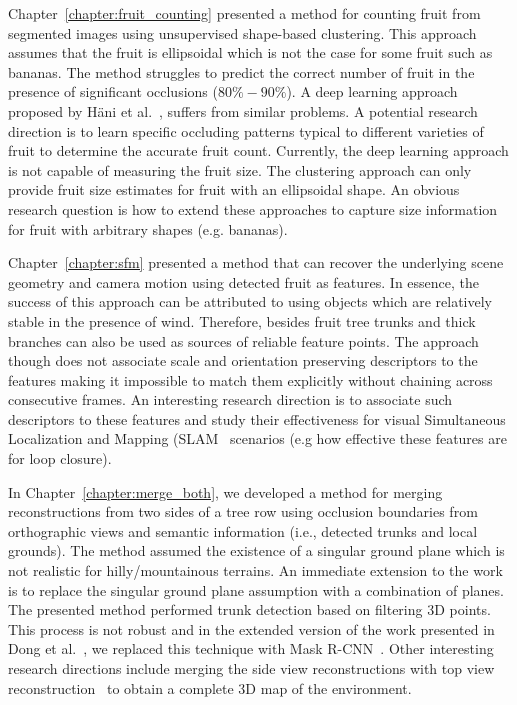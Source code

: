 Chapter~\ref{chapter:fruit_counting} presented a method for counting fruit from segmented images using unsupervised shape-based clustering. This approach assumes that the fruit is ellipsoidal which is not the case for some fruit such as bananas. The method struggles to predict the correct number of fruit in the presence of significant occlusions ($80\%- 90\%$). A deep learning approach proposed by  H{\"a}ni et al.~\cite{hani_jfr_counting}, suffers from similar problems. A potential research direction is to learn specific occluding patterns typical to different varieties of fruit to determine the accurate fruit count. Currently, the deep learning approach is not capable of measuring the fruit size. The clustering approach can only provide fruit size estimates for fruit with an ellipsoidal shape. An obvious research question is how to extend these approaches to capture size information for fruit with arbitrary shapes (e.g. bananas). 


Chapter~\ref{chapter:sfm} presented a method that can recover the underlying scene geometry and camera motion using detected fruit as features. In essence, the success of this approach can be attributed to using objects which are relatively stable in the presence of wind. Therefore, besides fruit tree trunks and thick branches can also be used as sources of reliable feature points. The approach though does not associate scale and orientation preserving descriptors to the features making it impossible to match them explicitly without chaining across consecutive frames. An interesting research direction is to associate such descriptors to these features and study their effectiveness for visual Simultaneous Localization and Mapping (SLAM~\cite{mur2017orb} scenarios (e.g how effective these features are for loop closure). 


In Chapter~\ref{chapter:merge_both}, we developed a method for merging reconstructions from two sides of a tree row using occlusion boundaries from orthographic views and semantic information (i.e., detected trunks and local grounds). The method assumed the existence of a singular ground plane which is not realistic for hilly/mountainous terrains. An immediate extension to the work is to replace the singular ground plane assumption with a combination of planes. The presented method performed trunk detection based on filtering 3D points. This process is not robust and in the extended version of the work presented in Dong et al.~\cite{dong2018semantic}, we replaced this technique with Mask R-CNN~\cite{he2017mask}. Other interesting research directions include merging the side view reconstructions with top view reconstruction~\cite{PengI17} to obtain a complete 3D map of the environment.

